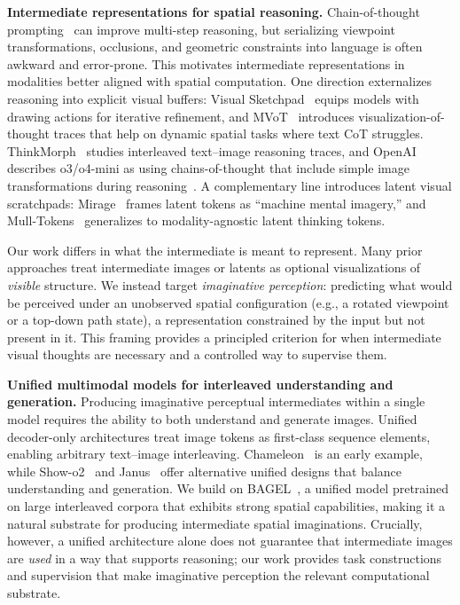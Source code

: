 \documentclass{llmxive}
\begin{document}
\noindent\textbf{Intermediate representations for spatial reasoning.}
Chain-of-thought prompting~\cite{wei2022cot} can improve multi-step reasoning, but serializing viewpoint transformations, occlusions, and geometric constraints into language is often awkward and error-prone. This motivates intermediate representations in modalities better aligned with spatial computation. One direction externalizes reasoning into explicit visual buffers: Visual Sketchpad~\cite{hu2024visualsketchpad} equips models with drawing actions for iterative refinement, and MVoT~\cite{li2025mvot} introduces visualization-of-thought traces that help on dynamic spatial tasks where text CoT struggles. ThinkMorph~\cite{gu2025thinkmorph} studies interleaved text--image reasoning traces, and OpenAI describes o3/o4-mini as using chains-of-thought that include simple image transformations during reasoning~\cite{openai2025thinkingimages}. A complementary line introduces latent visual scratchpads: Mirage~\cite{yang2025mirage} frames latent tokens as ``machine mental imagery,'' and Mull-Tokens~\cite{ray2025mulltokens} generalizes to modality-agnostic latent thinking tokens.

Our work differs in what the intermediate is meant to represent. Many prior approaches treat intermediate images or latents as optional visualizations of \emph{visible} structure. We instead target \emph{imaginative perception}: predicting what would be perceived under an unobserved spatial configuration (e.g., a rotated viewpoint or a top-down path state), a representation constrained by the input but not present in it. This framing provides a principled criterion for when intermediate visual thoughts are necessary and a controlled way to supervise them.


\noindent\textbf{Unified multimodal models for interleaved understanding and generation.}
Producing imaginative perceptual intermediates within a single model requires the ability to both understand and generate images. Unified decoder-only architectures treat image tokens as first-class sequence elements, enabling arbitrary text--image interleaving. Chameleon~\cite{chameleon2024chameleon} is an early example, while Show-o2~\cite{xie2025showo2} and Janus~\cite{chen2025januspro} offer alternative unified designs that balance understanding and generation. We build on BAGEL~\cite{deng2025bagel}, a unified model pretrained on large interleaved corpora that exhibits strong spatial capabilities, making it a natural substrate for producing intermediate spatial imaginations. Crucially, however, a unified architecture alone does not guarantee that intermediate images are \emph{used} in a way that supports reasoning; our work provides task constructions and supervision that make imaginative perception the relevant computational substrate.
\end{document}

